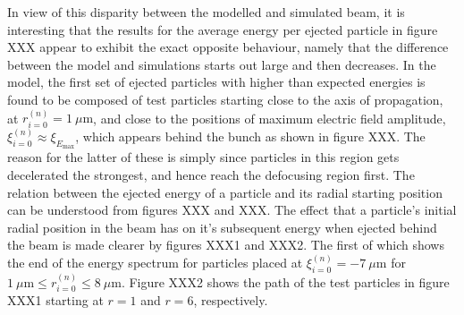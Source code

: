 \indent In view of this disparity between the modelled and simulated beam, it is interesting that the results for the average energy per ejected particle in figure XXX appear to exhibit the exact opposite behaviour, namely that the difference between the model and simulations starts out large and then decreases. In the model, the first set of ejected particles with higher than expected energies is found to be composed of test particles starting close to the axis of propagation, at $r_{i=0}^{(n)}=1~ \mu \text{m}$, and close to the positions of maximum electric field amplitude, $\xi_{i=0}^{(n)}\approx\xi_{E_{\text{max}}}$, which appears behind the bunch as shown in figure XXX. The reason for the latter of these is simply since particles in this region gets decelerated the strongest, and hence reach the defocusing region first. 
The relation between the ejected energy of a particle and its radial starting position can be understood from figures XXX and XXX. 
The effect that a particle's initial radial position in the beam has on it's subsequent energy when ejected behind the beam is made clearer by figures XXX1 and XXX2. The first of which shows the end of the energy spectrum for particles placed at $\xi_{i=0}^{(n)}=-7~\mu \text{m}$ for $1 ~\mu \text{m}\leq r_{i=0}^{(n)}\leq 8 ~\mu \text{m}$. Figure XXX2 shows the path of the test particles in figure XXX1 starting at $r=1$ and $r=6$, respectively. 




